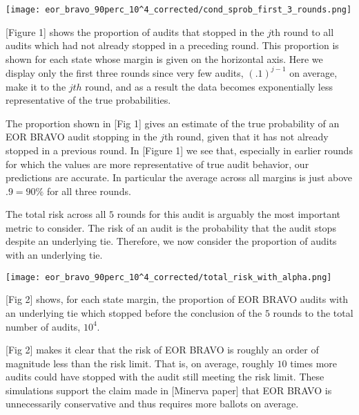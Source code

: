 \documentclass{article}
\begin{document}
\begin{center}
\texttt{[image: eor\_bravo\_90perc\_10^4\_corrected/cond\_sprob\_first\_3\_rounds.png]}
\end{center}
[Figure 1] shows the proportion of audits that stopped in the $j$th round
to all audits which had not already stopped in a preceding round.
This proportion is shown for each state whose margin is given on the 
horizontal axis.
Here we display only the first three rounds
since very few audits, $(.1)^{j-1}$ on average, 
make it to the $jth$ round, 
and as a result the data becomes exponentially less representative
of the true probabilities.

The proportion shown in [Fig 1] gives an estimate
of the true probability of an EOR BRAVO audit stopping in the $j$th round,
given that it has not already stopped in a previous round. 
In [Figure 1] we see that, especially in earlier rounds for which 
the values are more representative of true audit behavior, 
our predictions are accurate.
In particular the average across all margins is just above $.9=90\%$ for
all three rounds.

The total risk across all $5$ rounds for this audit is arguably
the most important metric to consider.
The risk of an audit is the probability that the audit
stops despite an underlying tie. 
Therefore, we now consider the proportion of audits with an underlying
tie.

\texttt{[image: eor\_bravo\_90perc\_10^4\_corrected/total\_risk\_with\_alpha.png]}

[Fig 2] shows, for each state margin,
the proportion of EOR BRAVO audits with an underlying
tie which stopped before the conclusion of the $5$ rounds to the 
total number of audits, $10^4$.

[Fig 2] makes it clear that the risk of EOR BRAVO is roughly
an order of magnitude less than the risk limit. 
That is, on average, roughly $10$ times more audits could have stopped 
with the audit still meeting the risk limit.
These simulations support the claim made in [Minerva paper]
that EOR BRAVO is unnecessarily conservative and thus requires
more ballots on average.


\end{document}
